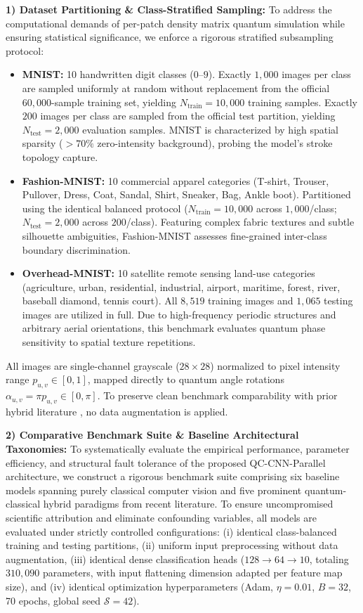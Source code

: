 \documentclass[journal]{IEEEtran}
\begin{document}
\textbf{1) Dataset Partitioning \& Class-Stratified Sampling:}
To address the computational demands of per-patch density matrix quantum simulation while ensuring statistical significance, we enforce a rigorous stratified subsampling protocol:
\begin{itemize}
    \item \textbf{MNIST:} 10 handwritten digit classes ($0$--$9$). Exactly $1{,}000$ images per class are sampled uniformly at random without replacement from the official $60{,}000$-sample training set, yielding $N_{\mathrm{train}} = 10{,}000$ training samples. Exactly $200$ images per class are sampled from the official test partition, yielding $N_{\mathrm{test}} = 2{,}000$ evaluation samples. MNIST is characterized by high spatial sparsity (${>}70\%$ zero-intensity background), probing the model's stroke topology capture.
    \item \textbf{Fashion-MNIST:} 10 commercial apparel categories (T-shirt, Trouser, Pullover, Dress, Coat, Sandal, Shirt, Sneaker, Bag, Ankle boot). Partitioned using the identical balanced protocol ($N_{\mathrm{train}} = 10{,}000$ across $1{,}000$/class; $N_{\mathrm{test}} = 2{,}000$ across $200$/class). Featuring complex fabric textures and subtle silhouette ambiguities, Fashion-MNIST assesses fine-grained inter-class boundary discrimination.
    \item \textbf{Overhead-MNIST:} 10 satellite remote sensing land-use categories (agriculture, urban, residential, industrial, airport, maritime, forest, river, baseball diamond, tennis court). All $8{,}519$ training images and $1{,}065$ testing images are utilized in full. Due to high-frequency periodic structures and arbitrary aerial orientations, this benchmark evaluates quantum phase sensitivity to spatial texture repetitions.
\end{itemize}
All images are single-channel grayscale ($28 \times 28$) normalized to pixel intensity range $p_{u,v} \in [0, 1]$, mapped directly to quantum angle rotations $\alpha_{u,v} = \pi p_{u,v} \in [0, \pi]$. To preserve clean benchmark comparability with prior hybrid literature \cite{henderson2020quanvolutional, senokosov2024quantum}, no data augmentation is applied.

\textbf{2) Comparative Benchmark Suite \& Baseline Architectural Taxonomies:}
To systematically evaluate the empirical performance, parameter efficiency, and structural fault tolerance of the proposed QC-CNN-Parallel architecture, we construct a rigorous benchmark suite comprising six baseline models spanning purely classical computer vision and five prominent quantum-classical hybrid paradigms from recent literature. To ensure uncompromised scientific attribution and eliminate confounding variables, all models are evaluated under strictly controlled configurations: (i) identical class-balanced training and testing partitions, (ii) uniform input preprocessing without data augmentation, (iii) identical dense classification heads ($128 \to 64 \to 10$, totaling $310{,}090$ parameters, with input flattening dimension adapted per feature map size), and (iv) identical optimization hyperparameters (Adam, $\eta = 0.01$, $B = 32$, 70 epochs, global seed $\mathcal{S}=42$).
\end{document}
